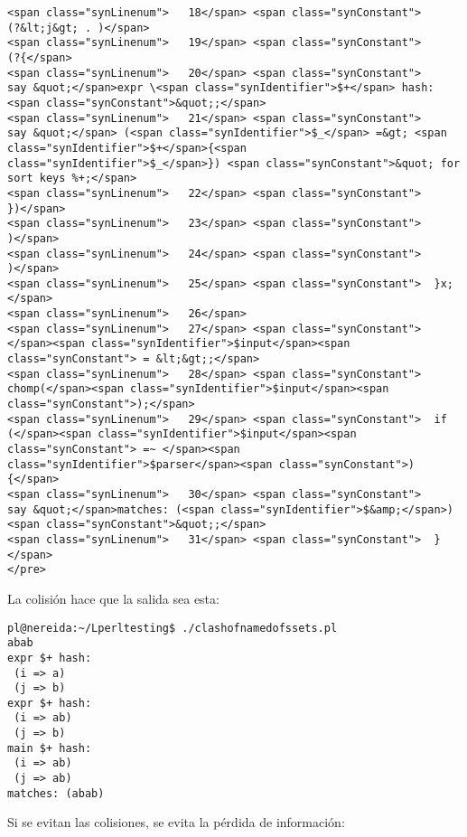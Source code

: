 \begin{verbatim}
<span class="synLinenum">   18</span> <span class="synConstant">              (?&lt;j&gt; . )</span>
<span class="synLinenum">   19</span> <span class="synConstant">                (?{</span>
<span class="synLinenum">   20</span> <span class="synConstant">                    say &quot;</span>expr \<span class="synIdentifier">$+</span> hash:<span class="synConstant">&quot;;</span>
<span class="synLinenum">   21</span> <span class="synConstant">                    say &quot;</span> (<span class="synIdentifier">$_</span> =&gt; <span class="synIdentifier">$+</span>{<span class="synIdentifier">$_</span>}) <span class="synConstant">&quot; for sort keys %+;</span>
<span class="synLinenum">   22</span> <span class="synConstant">                })</span>
<span class="synLinenum">   23</span> <span class="synConstant">          )</span>
<span class="synLinenum">   24</span> <span class="synConstant">      )</span>
<span class="synLinenum">   25</span> <span class="synConstant">  }x;</span>
<span class="synLinenum">   26</span> 
<span class="synLinenum">   27</span> <span class="synConstant">  </span><span class="synIdentifier">$input</span><span class="synConstant"> = &lt;&gt;;</span>
<span class="synLinenum">   28</span> <span class="synConstant">  chomp(</span><span class="synIdentifier">$input</span><span class="synConstant">);</span>
<span class="synLinenum">   29</span> <span class="synConstant">  if (</span><span class="synIdentifier">$input</span><span class="synConstant"> =~ </span><span class="synIdentifier">$parser</span><span class="synConstant">) {</span>
<span class="synLinenum">   30</span> <span class="synConstant">    say &quot;</span>matches: (<span class="synIdentifier">$&amp;</span>)<span class="synConstant">&quot;;</span>
<span class="synLinenum">   31</span> <span class="synConstant">  }</span>
</pre>

\end{verbatim}
La colisión hace que la salida sea esta:
\begin{verbatim}
pl@nereida:~/Lperltesting$ ./clashofnamedofssets.pl
abab
expr $+ hash:
 (i => a)
 (j => b)
expr $+ hash:
 (i => ab)
 (j => b)
main $+ hash:
 (i => ab)
 (j => ab)
matches: (abab)
\end{verbatim}
Si se evitan las colisiones, 
se evita la pérdida de información:
